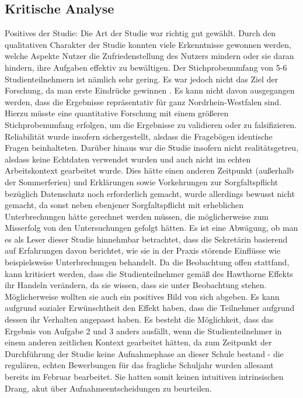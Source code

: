 \subsection{Kritische Analyse}
Positives der Studie: Die Art der Studie war richtig gut gewählt. Durch den qualitativen Charakter der Studie konnten viele Erkenntnisse gewonnen werden, welche Aspekte Nutzer die Zufriedenstellung des Nutzers mindern oder sie daran hindern, ihre Aufgaben effektiv zu bewältigen. 
Der Stichprobenumfang von 5-6 Studienteilnehmern ist nämlich sehr gering. Es war jedoch nicht das Ziel der Forschung, da man erste Eindrücke gewinnen . Es kann nicht davon ausgegangen werden, dass die Ergebnisse repräsentativ für ganz Nordrhein-Westfalen sind. Hierzu müsste eine quantitative Forschung mit einem größeren Stichprobenumfang erfolgen, um die Ergebnisse zu validieren oder zu falsifizieren.
Reliabilität wurde insofern sichergestellt, alsdass die Fragebögen identische Fragen beinhalteten. 
Darüber hinaus war die Studie insofern nicht realitätsgetreu, alsdass keine Echtdaten verwendet wurden und auch nicht im echten Arbeitskontext gearbeitet wurde. Dies hätte einen anderen Zeitpunkt (außerhalb der Sommerferien) und Erklärungen sowie Vorkehrungen zur Sorgfaltspflicht bezüglich Datenschutz noch erforderlich gemacht, wurde allerdings bewusst nicht gemacht, da sonst neben ebenjener Sorgfaltspflicht mit erheblichen Unterbrechungen hätte gerechnet werden müssen, die möglicherweise zum Misserfolg von den Untersuchungen gefolgt hätten. Es ist eine Abwägung, ob man es als Leser dieser Studie hinnehmbar betrachtet, dass die Sekretärin basierend auf Erfahrungen davon berichtet, wie sie in der Praxis störende Einflüsse wie beispielsweise Unterbrechungen behandelt.
Da die Beobachtung offen stattfand, kann kritisiert werden, dass die Studienteilnehmer gemäß des Hawthorne Effekts ihr Handeln verändern, da sie wissen, dass sie unter Beobachtung stehen.
Möglicherweise wollten sie auch ein positives Bild von sich abgeben. Es kann aufgrund sozialer Erwünschtheit den Effekt haben, dass die Teilnehmer aufgrund dessen ihr Verhalten angepasst haben.
Es besteht die Möglichkeit, dass das Ergebnis von Aufgabe 2 und 3 anders ausfällt, wenn die Studienteilnehmer in einem anderen zeitlichen Kontext gearbeitet hätten, da zum Zeitpunkt der Durchführung der Studie keine Aufnahmephase an dieser Schule bestand - die regulären, echten Bewerbungen für das fragliche Schuljahr wurden allesamt bereits im Februar bearbeitet. Sie hatten somit keinen intuitiven intrinsischen Drang, akut über Aufnahmeentscheidungen zu beurteilen. 

